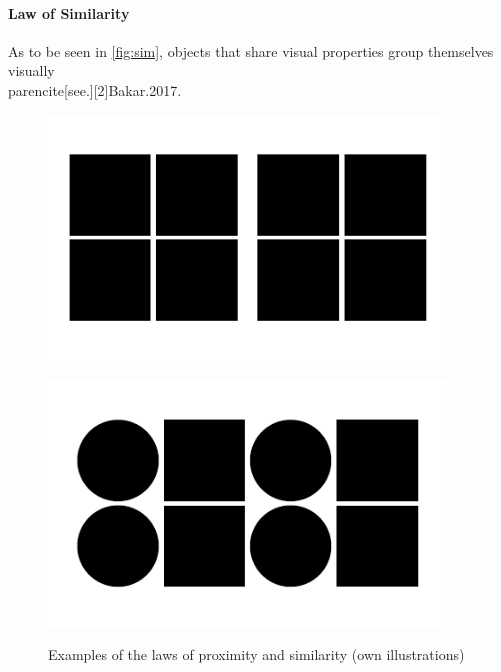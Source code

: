 \paragraph*{Law of Similarity} As to be seen in \ref{fig:sim}, objects that share visual properties group themselves visually \\parencite[see.][2]{Bakar.2017}.
\begin{figure}[H] 
    \begin{minipage}[b]{.5\linewidth}
        \centering\includegraphics[width=0.94\textwidth]{img/proximity.pdf}
        \label{fig:prox}
    \end{minipage}%
    \begin{minipage}[b]{.5\linewidth}
        \centering\includegraphics[width=0.94\textwidth]{img/similarity.pdf}
        \label{fig:sim}
    \end{minipage}
    \caption[Laws of Proximity and Similarity]{Examples of the laws of proximity and similarity (own illustrations)}\label{fig:law1}
\end{figure}

